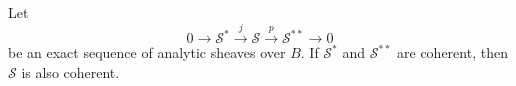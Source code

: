 Let
$$
0 \longrightarrow \mathcal{S}^* \xrightarrow{j} \mathcal{S} \xrightarrow{p} \mathcal{S}^{**} \longrightarrow 0
$$
be an exact sequence of analytic sheaves over $B$. If $\mathcal{S}^*$ and $\mathcal{S}^{**}$ are coherent, then $\mathcal{S}$ is also coherent.
